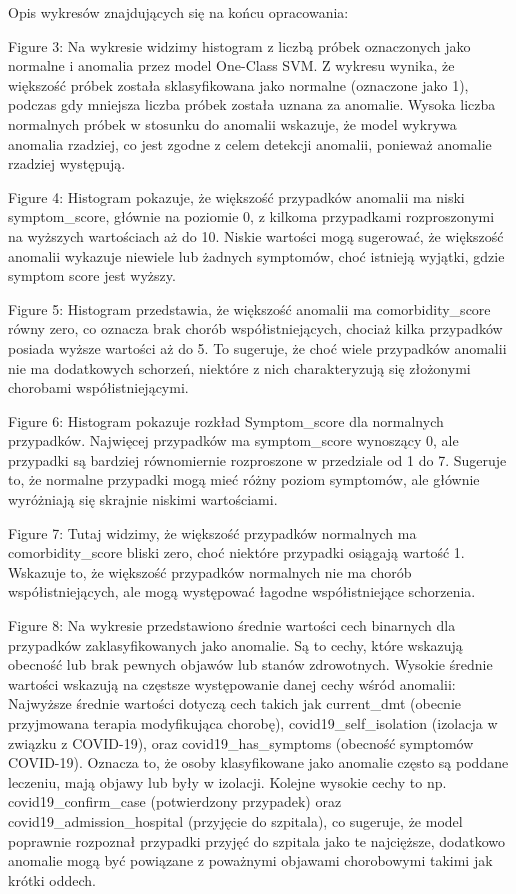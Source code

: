\documentclass[a4paper,fleqn]{cas-dc}
\begin{document}
Opis wykresów znajdujących się na końcu opracowania:

Figure 3: Na wykresie widzimy histogram z liczbą próbek oznaczonych jako normalne i anomalia przez model One-Class SVM.
Z wykresu wynika, że większość próbek została sklasyfikowana jako normalne (oznaczone jako 1), podczas gdy mniejsza liczba próbek została uznana za anomalie.
Wysoka liczba normalnych próbek w stosunku do anomalii wskazuje, że model wykrywa anomalia rzadziej, co jest zgodne z celem detekcji anomalii, ponieważ anomalie rzadziej występują.


Figure 4: Histogram pokazuje, że większość przypadków anomalii ma niski symptom\_score, głównie na poziomie 0, z kilkoma przypadkami rozproszonymi na wyższych wartościach aż do 10. Niskie wartości mogą sugerować, że większość anomalii wykazuje niewiele lub żadnych symptomów, choć istnieją wyjątki, gdzie symptom score jest wyższy.


Figure 5: Histogram przedstawia, że większość anomalii ma comorbidity\_score równy zero, co oznacza brak chorób współistniejących, chociaż kilka przypadków posiada wyższe wartości aż do 5. To sugeruje, że choć wiele przypadków anomalii nie ma dodatkowych schorzeń, niektóre z nich charakteryzują się złożonymi chorobami współistniejącymi.


Figure 6: Histogram pokazuje rozkład Symptom\_score dla normalnych przypadków. Najwięcej przypadków ma symptom\_score wynoszący 0, ale przypadki są bardziej równomiernie rozproszone w przedziale od 1 do 7. Sugeruje to, że normalne przypadki mogą mieć różny poziom symptomów, ale głównie wyróżniają się skrajnie niskimi wartościami.


Figure 7: Tutaj widzimy, że większość przypadków normalnych ma comorbidity\_score bliski zero, choć niektóre przypadki osiągają wartość 1. Wskazuje to, że większość przypadków normalnych nie ma chorób współistniejących, ale mogą występować łagodne współistniejące schorzenia.

Figure 8: Na wykresie przedstawiono średnie wartości cech binarnych dla przypadków zaklasyfikowanych jako anomalie. Są to cechy, które wskazują obecność lub brak pewnych objawów lub stanów zdrowotnych. Wysokie średnie wartości wskazują na częstsze występowanie danej cechy wśród anomalii:
Najwyższe średnie wartości dotyczą cech takich jak current\_dmt (obecnie przyjmowana terapia modyfikująca chorobę), covid19\_self\_isolation (izolacja w związku z COVID-19), oraz covid19\_has\_symptoms (obecność symptomów COVID-19). Oznacza to, że osoby klasyfikowane jako anomalie często są poddane leczeniu, mają objawy lub były w izolacji.
Kolejne wysokie cechy to np. covid19\_confirm\_case (potwierdzony przypadek) oraz covid19\_admission\_hospital (przyjęcie do szpitala), co sugeruje, że model poprawnie rozpoznał przypadki przyjęć do szpitala jako te najcięższe, dodatkowo anomalie mogą być powiązane z poważnymi objawami chorobowymi takimi jak krótki oddech.
\end{document}
